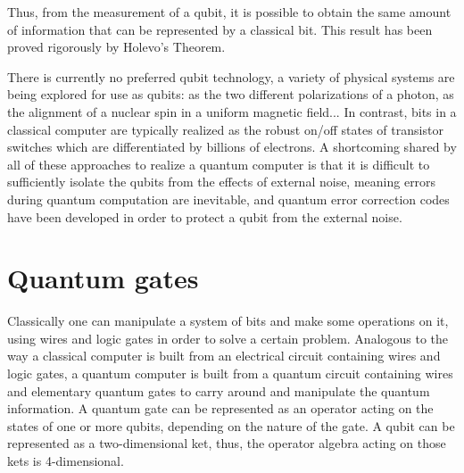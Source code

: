 Thus, from the measurement of a qubit, it is possible to obtain the same amount of information that can be represented by a classical bit. This result has been proved rigorously by Holevo's Theorem.








There is currently no preferred qubit technology, a variety of physical systems are being explored for use as qubits: as the two different polarizations of a photon, as the alignment of a nuclear spin in a uniform magnetic field... 
In contrast, bits in a classical computer are typically realized as the robust on/off states of transistor switches which are differentiated by billions of electrons.
A shortcoming shared by all of these approaches to realize a quantum computer is that it is difficult to sufficiently isolate the qubits from the effects of external noise, meaning errors during quantum computation are inevitable, and quantum error correction codes have been developed in order to protect a qubit from the external noise. 


\section{Quantum gates}\label{sec:qgate}

Classically one can manipulate a system of bits and make some operations on it, using wires and logic gates in order to solve a certain problem. Analogous to the way a classical computer is built from an electrical circuit containing wires and logic gates, a quantum computer is built from a quantum circuit containing wires and elementary quantum gates to carry around and manipulate the quantum information.
A quantum gate can be represented as an operator acting on the states of one or more qubits, depending on the nature of the gate.
A qubit can be represented as a two-dimensional ket, thus, the operator algebra acting on those kets is 4-dimensional. 


